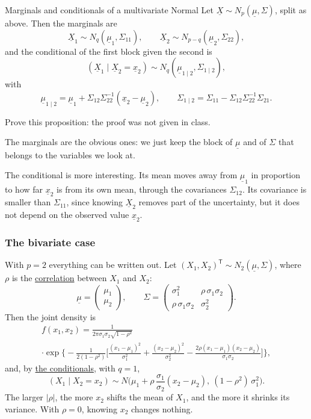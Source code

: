\documentclass[a4paper,12pt,oneside]{report}
\begin{document}
\begin{framedprop}{Marginals and conditionals of a multivariate Normal}\label{prop:mvn-marginals}
Let $\underline{X}\sim N_p(\underline{\mu},\Sigma)$, split as above. Then
the marginals are
\[
\underline{X}_1\sim N_q(\underline{\mu}_1,\Sigma_{11}),
\qquad
\underline{X}_2\sim N_{p-q}(\underline{\mu}_2,\Sigma_{22}),
\]
and the conditional of the first block given the second is
\[
(\underline{X}_1\mid\underline{X}_2=\underline{x}_2)\sim N_q(\underline{\mu}_{1\mid2},\Sigma_{1\mid2}),
\]
with
\[
\underline{\mu}_{1\mid2}=\underline{\mu}_1+\Sigma_{12}\Sigma_{22}^{-1}(\underline{x}_2-\underline{\mu}_2),
\qquad
\Sigma_{1\mid2}=\Sigma_{11}-\Sigma_{12}\Sigma_{22}^{-1}\Sigma_{21}.
\]
\end{framedprop}

\begin{todobox}
Prove this proposition: the proof was not given in class.
\end{todobox}

The marginals are the obvious ones: we just keep the block of
$\underline{\mu}$ and of $\Sigma$ that belongs to the variables we look at.

The conditional is more interesting. Its mean moves away from
$\underline{\mu}_1$ in proportion to how far $\underline{x}_2$ is from its
own mean, through the covariances $\Sigma_{12}$. Its covariance is smaller
than $\Sigma_{11}$, since knowing $\underline{X}_2$ removes part of the
uncertainty, but it does not depend on the observed value
$\underline{x}_2$.

\subsubsection{The bivariate case}\label{sec:mvn-bivariate}

With $p=2$ everything can be written out. Let
$(X_1,X_2)^{\mathsf T}\sim N_2(\underline{\mu},\Sigma)$, where $\rho$ is
the \hyperref[def:correlation]{correlation} between $X_1$ and $X_2$:
\[
\underline{\mu}=\begin{pmatrix}\mu_1\\ \mu_2\end{pmatrix},
\qquad
\Sigma=\begin{pmatrix}\sigma_1^2&\rho\,\sigma_1\sigma_2\\ \rho\,\sigma_1\sigma_2&\sigma_2^2\end{pmatrix}.
\]
Then the joint density is
\begin{multline*}
f(x_1,x_2)=\frac{1}{2\pi\sigma_1\sigma_2\sqrt{1-\rho^2}}\\
\cdot\exp\bigg\{-\frac{1}{2(1-\rho^2)}\bigg[\frac{(x_1-\mu_1)^2}{\sigma_1^2}+\frac{(x_2-\mu_2)^2}{\sigma_2^2}
-\frac{2\rho(x_1-\mu_1)(x_2-\mu_2)}{\sigma_1\sigma_2}\bigg]\bigg\},
\end{multline*}
and, by \hyperref[prop:mvn-marginals]{the conditionals}, with $q=1$,
\[
(X_1\mid X_2=x_2)\sim N\Big(\mu_1+\rho\,\frac{\sigma_1}{\sigma_2}(x_2-\mu_2),\ (1-\rho^2)\,\sigma_1^2\Big).
\]
The larger $|\rho|$, the more $x_2$ shifts the mean of $X_1$, and the
more it shrinks its variance. With $\rho=0$, knowing $x_2$ changes nothing.
\end{document}
